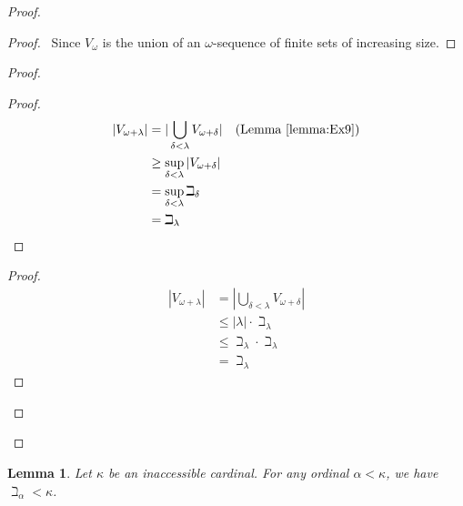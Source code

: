 \documentclass{article}
\let\qed\relax
\newtheorem{lemma}[axiom]{Lemma}
\theoremstyle{definition}
\begin{document}
    \begin{proof}
        \pf
        \begin{proof}
            \pf\ Since $V_\omega$ is the union of an $\omega$-sequence of finite sets of increasing size.
        \end{proof}
        \begin{proof}
            \begin{proof}
                \pf
                \begin{align*}
                    |V_{\omega + \lambda}| & = |\bigcup_{\delta < \lambda} V_{\omega + \delta}| &
                    (\text{Lemma \ref{lemma:Ex9}}) \\
                    & \geq \sup_{\delta < \lambda} |V_{\omega + \delta}| \\
                    & = \sup_{\delta < \lambda} \beth_\delta \\
                    & = \beth_\lambda
                \end{align*}
            \end{proof}
            \begin{proof}
                \pf
                \begin{align*}
                    |V_{\omega + \lambda}| & = |\bigcup_{\delta < \lambda} V_{\omega + \delta}| \\
                    & \leq |\lambda| \cdot \beth_\lambda \\
                    & \leq \beth_\lambda \cdot \beth_\lambda \\
                    & = \beth_\lambda
                \end{align*}
            \end{proof}
        \end{proof}
        \qed
    \end{proof}

    \begin{lemma}
        Let $\kappa$ be an inaccessible cardinal. For any ordinal $\alpha < \kappa$, we have
        $\beth_\alpha < \kappa$.
    \end{lemma}
\end{document}
